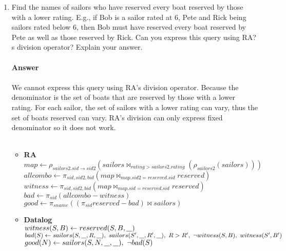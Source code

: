 \documentclass{article}
\newcommand{\anyvar}{\underline{\hspace{0.8em}}}
\newcommand{\RA}{\textbf{RA}}
\newcommand{\DL}{\textbf{Datalog}}
\begin{document}
\begin{enumerate}
	\begin{itemize}
	\item \RA \\
	$ notoldest \gets \pi_{sailors.sid}(sailors \bowtie_{sailors.age < sailors2.age} (\rho_{sailors2}(sailors)))$ \\
	$ oldest \gets \pi_{sname, rating}((\pi_{sid} sailors - notoldest) \bowtie sailors) $
	\item \DL \\
	$ notoldest(S) \gets sailors(S, \anyvar, \anyvar, A),\ sailors(S', \anyvar, \anyvar, A'),\ A < A' $ \\
	$ oldest(N, R) \gets sailors(S, N, R, \anyvar),\ \neg notoldest(S) $
	\end{itemize}
\item Find the names of sailors who have reserved every boat reserved by those with a lower rating. E.g., if Bob is a sailor rated at 6, Pete and Rick being sailors rated below 6, then Bob must have reserved every boat reserved by Pete as well as those reserved by Rick. Can you express this query using RA?s division operator? Explain your answer.\\
\\
\textbf{Answer}\\
\\
We cannot express this query using RA's division operator. Because the denominator is the set of boats that are reserved by those with a lower rating. For each sailor, the set of sailors with a lower rating can vary, thus the set of boats reserved can vary. RA's division can only express fixed denominator so it does not work.\\
\\
\begin{itemize}
	\item \RA \\
	$ map \gets \rho_{sailors2.sid \to sid2}(sailors \bowtie_{rating > sailors2.rating} (\rho_{sailors2} (sailors))) $ \\
	$ allcombo \gets \pi_{sid, sid2, bid}(map \bowtie_{map.sid2 = reserved.sid} reserved) $ \\
	$ witness \gets \pi_{sid, sid2, bid}(map \bowtie_{map.sid = reserved.sid} reserved)$ \\
	$ bad \gets \pi_{sid} (allcombo - witness) $ \\
	$ good \gets \pi_{sname}((\pi_{sid} reserved - bad) \bowtie sailors) $ 
	\item \DL \\
	$ witness(S, B) \gets reserved(S, B, \anyvar) $ \\
	$ bad(S) \gets sailors(S, \anyvar, R, \anyvar),\ sailors(S', \anyvar, R', \anyvar),\ R > R',\ \neg witness(S, B),\  witness(S', B') $ \\
	$ good(N) \gets sailors(S, N, \anyvar, \anyvar), \ \neg bad(S)$
\end{itemize}

\end{enumerate}
\end{document}
